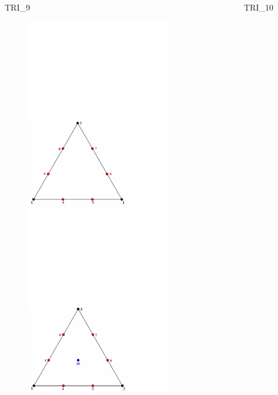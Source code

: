 {{{TRI\_9~~~~~~~~~~~~~~~~~~~~~~~~~~~~~~~~~~~~~~~~~~~~~~~~~~~~TRI\_10
\begin{figure}[!htb]
   \includegraphics[width=2.5in]{conv.figs/TecplotFiles_Cubic_Element/All_Figures/Tri_9}
   \includegraphics[width=2.5in]{conv.figs/TecplotFiles_Cubic_Element/All_Figures/Tri_10}
\end{figure}

\vspace{1.5\baselineskip}

}}}
